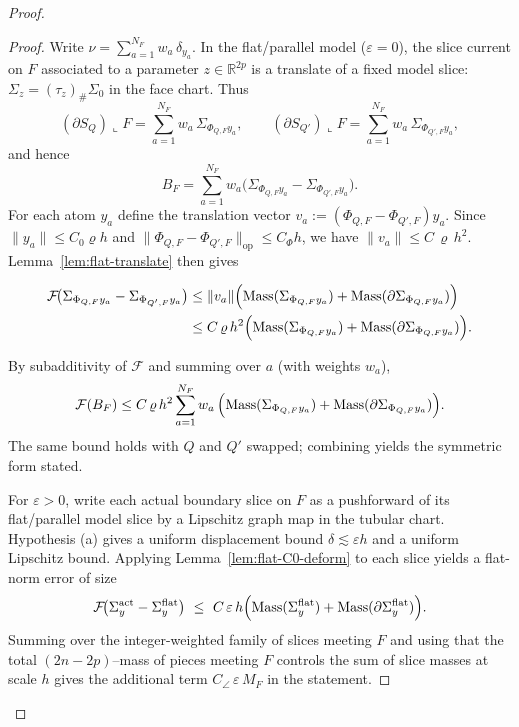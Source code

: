\documentclass[11pt]{article}
\numberwithin{equation}{section}  %
\theoremstyle{plain}
\theoremstyle{definition}
\theoremstyle{remark}
\newcommand{\R}{\mathbb{R}}
\DeclareMathOperator{\Mass}{Mass}
\begin{document}
\begin{proof}
\begin{proof}
Write $\nu=\sum_{a=1}^{N_F} w_a\,\delta_{y_a}$.
In the flat/parallel model ($\varepsilon=0$), the slice current on $F$ associated to a parameter $z\in\R^{2p}$ is a translate of a fixed model slice:
$\Sigma_z=(\tau_z)_\#\Sigma_0$ in the face chart.
Thus
\[
(\partial S_Q)\llcorner F=\sum_{a=1}^{N_F} w_a\,\Sigma_{\Phi_{Q,F}y_a},
\qquad
(\partial S_{Q'})\llcorner F=\sum_{a=1}^{N_F} w_a\,\Sigma_{\Phi_{Q',F}y_a},
\]
and hence
\[
B_F=\sum_{a=1}^{N_F} w_a\bigl(\Sigma_{\Phi_{Q,F}y_a}-\Sigma_{\Phi_{Q',F}y_a}\bigr).
\]
For each atom $y_a$ define the translation vector $v_a:=(\Phi_{Q,F}-\Phi_{Q',F})y_a$.
Since $\|y_a\|\le C_0\varrho h$ and $\|\Phi_{Q,F}-\Phi_{Q',F}\|_{\mathrm{op}}\le C_\Phi h$, we have $\|v_a\|\le C\,\varrho\,h^2$.
Lemma~\ref{lem:flat-translate} then gives

\[
\begin{aligned}
	\mathcal F\!\bigl(\Sigma_{\Phi_{Q,F}y_a}-\Sigma_{\Phi_{Q',F}y_a}\bigr)
	&\le \|v_a\|\Bigl(\Mass(\Sigma_{\Phi_{Q,F}y_a})+\Mass(\partial\Sigma_{\Phi_{Q,F}y_a})\Bigr) \\
	&\le C\,\varrho\,h^2\Bigl(\Mass(\Sigma_{\Phi_{Q,F}y_a})+\Mass(\partial\Sigma_{\Phi_{Q,F}y_a})\Bigr).
\end{aligned}
\]

By subadditivity of $\mathcal F$ and summing over $a$ (with weights $w_a$),
\[
\mathcal F(B_F)\le C\,\varrho\,h^2\sum_{a=1}^{N_F} w_a\,\Bigl(\Mass(\Sigma_{\Phi_{Q,F}y_a})+\Mass(\partial\Sigma_{\Phi_{Q,F}y_a})\Bigr).
\]
The same bound holds with $Q$ and $Q'$ swapped; combining yields the symmetric form stated.

For $\varepsilon>0$, write each actual boundary slice on $F$ as a pushforward of its flat/parallel model slice
by a Lipschitz graph map in the tubular chart.
Hypothesis \textnormal{(a)} gives a uniform displacement bound $\delta\lesssim\varepsilon h$ and a uniform Lipschitz bound.
Applying Lemma~\ref{lem:flat-C0-deform} to each slice yields a flat-norm error of size
\[
\mathcal F\!\bigl(\Sigma^{\mathrm{act}}_y-\Sigma^{\mathrm{flat}}_y\bigr)\ \le\ C\,\varepsilon\,h\Bigl(\Mass(\Sigma^{\mathrm{flat}}_y)+\Mass(\partial\Sigma^{\mathrm{flat}}_y)\Bigr).
\]
Summing over the integer-weighted family of slices meeting $F$ and using that the total $(2n-2p)$--mass of pieces meeting $F$
controls the sum of slice masses at scale $h$ gives the additional term
$C_{\angle}\,\varepsilon\,M_F$ in the statement.
\end{proof}


\end{proof}
\end{document}
